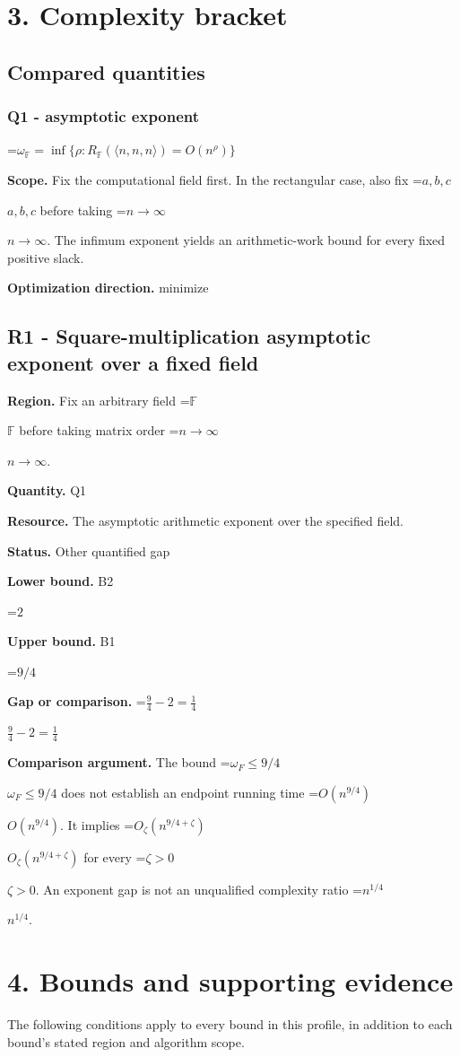 \documentclass[10pt,a4paper]{article}
\newcommand{\AtlasMath}[1]{\par\begingroup\centering\setbox0=\hbox{$\displaystyle #1$}\ifdim\wd0>1.4\linewidth\typeout{ATLAS WIDE FORMULA: \the\wd0}\fi\ifdim\wd0>\linewidth\resizebox{\linewidth}{!}{\box0}\else\box0\fi\par\endgroup}
\newcommand{\AtlasInlineMath}[1]{\begingroup\setbox0=\hbox{$#1$}\ifdim\wd0>.4\linewidth\endgroup\AtlasMath{#1}\else\endgroup$#1$\fi}
\begin{document}
\section{3. Complexity bracket}
\subsection{Compared quantities}
\subsubsection{Q1 - asymptotic exponent}
\AtlasMath{\omega_{\mathbb F}=\inf\{\rho:R_{\mathbb F}(\langle n,n,n\rangle)=O(n^\rho)\}}
\textbf{Scope.} Fix the computational field first. In the rectangular case, also fix \AtlasInlineMath{a,b,c} before taking \AtlasInlineMath{n\to\infty}. The infimum exponent yields an arithmetic-work bound for every fixed positive slack.

\textbf{Optimization direction.} minimize

\subsection{R1 - Square-multiplication asymptotic exponent over a fixed field}
\textbf{Region.} Fix an arbitrary field \AtlasInlineMath{\mathbb F} before taking matrix order \AtlasInlineMath{n\to\infty}.

\textbf{Quantity.} Q1

\textbf{Resource.} The asymptotic arithmetic exponent over the specified field.

\textbf{Status.} Other quantified gap

\textbf{Lower bound.} B2

\AtlasMath{2}
\textbf{Upper bound.} B1

\AtlasMath{9/4}
\textbf{Gap or comparison.} \AtlasInlineMath{\frac94-2=\frac14}

\textbf{Comparison argument.} The bound \AtlasInlineMath{\omega_F\le9/4} does not establish an endpoint running time \AtlasInlineMath{O(n^{9/4})}. It implies \AtlasInlineMath{O_\zeta(n^{9/4+\zeta})} for every \AtlasInlineMath{\zeta>0}. An exponent gap is not an unqualified complexity ratio \AtlasInlineMath{n^{1/4}}.

\section{4. Bounds and supporting evidence}
The following conditions apply to every bound in this profile, in addition to each bound's stated region and algorithm scope.
\end{document}
